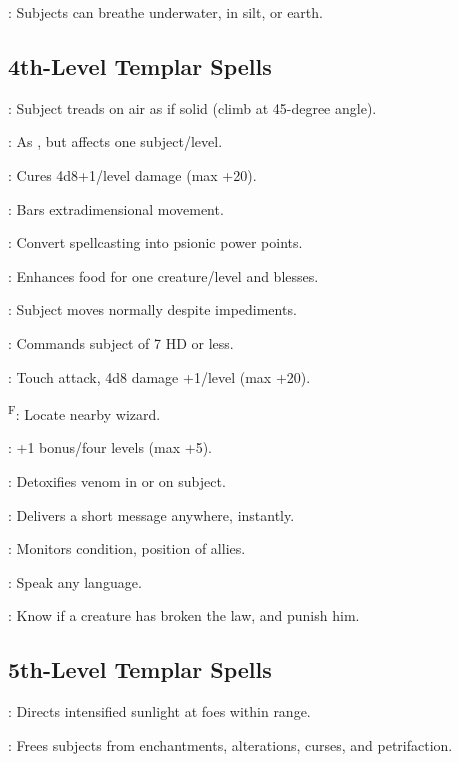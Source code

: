 : Subjects can breathe underwater, in silt, or earth.



\subsection{4th-Level Templar Spells}

: Subject treads on air as if solid (climb at 45-degree angle).

: As , but affects one subject/level.

: Cures 4d8+1/level damage (max +20).

: Bars extradimensional movement.

: Convert spellcasting into psionic power points.

: Enhances food for one creature/level and blesses.

: Subject moves normally despite impediments.

: Commands subject of 7 HD or less.

: Touch attack, 4d8 damage +1/level (max +20).

\textsuperscript{F}: Locate nearby wizard.

: +1 bonus/four levels (max +5).

: Detoxifies venom in or on subject.

: Delivers a short message anywhere, instantly.

: Monitors condition, position of allies.

: Speak any language.

: Know if a creature has broken the law, and punish him.



\subsection{5th-Level Templar Spells}

: Directs intensified sunlight at foes within range.

: Frees subjects from enchantments, alterations, curses, and petrifaction.

